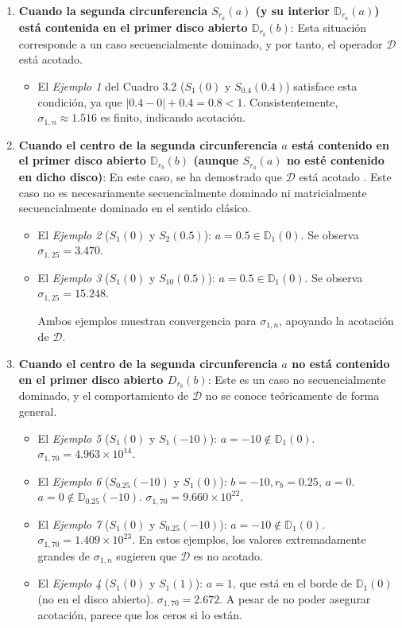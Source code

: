 \begin{enumerate}
  \item \textbf{Cuando la segunda circunferencia $S_{r_a}(a)$ (y su interior $\mathbb{D}_{r_a}(a)$) está contenida en el primer disco abierto $\mathbb{D}_{r_b}(b)$}: Esta situación corresponde a un caso secuencialmente dominado, y por tanto, el operador $\mathcal{D}$ está acotado.
        \begin{itemize}
          \item El \textit{Ejemplo 1} del Cuadro 3.2 ($S_{1}(0)$ y $S_{0.4}(0.4)$) satisface esta condición, ya que $|0.4-0|+0.4 = 0.8 < 1$. Consistentemente, $\sigma_{1,n} \approx 1.516$ es finito, indicando acotación.
        \end{itemize}
  \item \textbf{Cuando el centro de la segunda circunferencia $a$ está contenido en el primer disco abierto $\mathbb{D}_{r_b}(b)$ (aunque $S_{r_a}(a)$ no esté contenido en dicho disco)}: En este caso, se ha demostrado que $\mathcal{D}$ está acotado \cite{escribano2025zeros}. Este caso no es necesariamente secuencialmente dominado ni matricialmente secuencialmente dominado en el sentido clásico.
        \begin{itemize}
          \item El \textit{Ejemplo 2} ($S_{1}(0)$ y $S_{2}(0.5)$): $a=0.5 \in \mathbb{D}_1(0)$. Se observa $\sigma_{1,25} = 3.470$.
          \item El \textit{Ejemplo 3} ($S_{1}(0)$ y $S_{10}(0.5)$): $a=0.5 \in \mathbb{D}_1(0)$. Se observa $\sigma_{1,25} = 15.248$.

                Ambos ejemplos muestran convergencia para $\sigma_{1,n}$, apoyando la acotación de $\mathcal{D}$.
        \end{itemize}
  \item \textbf{Cuando el centro de la segunda circunferencia $a$ no está contenido en el primer disco abierto $D_{r_b}(b)$}: Este es un caso no secuencialmente dominado, y el comportamiento de $\mathcal{D}$ no se conoce teóricamente de forma general.
        \begin{itemize}
          \item El \textit{Ejemplo 5} ($S_{1}(0)$ y $S_{1}(-10)$): $a=-10 \notin \mathbb{D}_1(0)$. $\sigma_{1,70} = 4.963 \times 10^{14}$.
          \item El \textit{Ejemplo 6} ($S_{0.25}(-10)$ y $S_{1}(0)$): $b=-10, r_b=0.25$, $a=0$. $a=0 \notin \mathbb{D}_{0.25}(-10)$. $\sigma_{1,70} = 9.660 \times 10^{22}$.
          \item El \textit{Ejemplo 7} ($S_{1}(0)$ y $S_{0.25}(-10)$): $a=-10 \notin \mathbb{D}_1(0)$. $\sigma_{1,70} = 1.409 \times 10^{23}$.
                En estos ejemplos, los valores extremadamente grandes de $\sigma_{1,n}$ sugieren que $\mathcal{D}$ es no acotado.
          \item El \textit{Ejemplo 4} ($S_{1}(0)$ y $S_{1}(1)$): $a=1$, que está en el borde de $\mathbb{D}_1(0)$ (no en el disco abierto). $\sigma_{1,70} = 2.672$. A pesar de no poder asegurar acotación, parece que los ceros si lo están.
        \end{itemize}
\end{enumerate}

